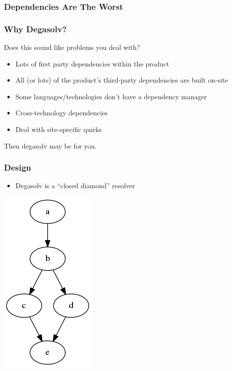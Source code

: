 \documentclass{beamer}
\begin{document}
\begin{frame}[fragile]
  \frametitle{Dependencies Are The Worst}

\end{frame}
\begin{frame}
  \frametitle{Why Degasolv?}
  Does this sound like problems you deal with?
  \begin{itemize}
  \item Lots of first party dependencies within the product
  \item All (or lots) of the product's third-party dependencies are built on-site
  \item Some languages/technologies don't have a dependency manager
  \item Cross-technology dependencies
  \item Deal with site-specific quirks
  \end{itemize}
  Then degasolv may be for you.
\end{frame}
\begin{frame}
  \frametitle{Design}
  \begin{itemize}
    \item Degasolv is a ``closed diamond'' resolver
  \end{itemize}
  \centerline{\includegraphics[scale=0.5]{diamonddep.png}}
\end{frame}
\end{document}
